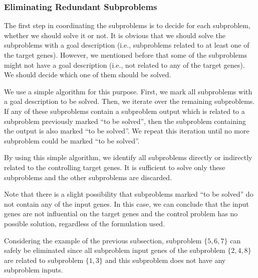 \subsubsection{Eliminating Redundant Subproblems}
The first step in coordinating the subproblems is to decide for each subproblem, whether we should solve it
or not. It is obvious that we should solve the subproblems with a goal description (i.e., subproblems related
to at least one of the target genes). However, we mentioned before that some of the subproblems might not
have a goal description (i.e., not related to any of the target genes). We should decide which one of them
should be solved.

We use a simple algorithm for this purpose. First, we mark all subproblems with a goal description to be
solved. Then, we iterate over the remaining subproblems. If any of these subproblems contain a subproblem
output which is related to a subproblem previously marked ``to be solved'', then the subproblem containing
the output is also marked ``to be solved''. We repeat this iteration until no more subproblem could be marked
``to be solved''.

By using this simple algorithm, we identify all subproblems directly or indirectly related to the controlling
target genes. It is sufficient to solve only these subproblems and the other subproblems are discarded.

Note that there is a slight possibility that subproblems marked ``to be solved'' do not contain any of the
input genes. In this case, we can conclude that the input genes are not influential on the target genes and
the control problem has no possible solution, regardless of the formulation used.

Considering the example of the previous subsection, subproblem $\{5,6,7\}$ can safely be eliminated since all subproblem input genes of the subproblem $\{2,4,8\}$ are related to subproblem $\{1,3\}$ and this subproblem does not have any subproblem inputs.

